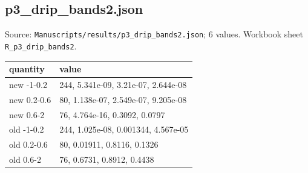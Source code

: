 \subsection*{p3\_drip\_bands2.json}
\noindent\small Source: \nolinkurl{Manuscripts/results/p3_drip_bands2.json}; 6 values. Workbook sheet \texttt{R\_p3\_drip\_bands2}.\par
{\scriptsize\begin{longtable}{p{}p{}}\toprule\textbf{quantity} & \textbf{value}\\\midrule\endhead
{}new -1-0.2 & 244, 5.341e-09, 3.21e-07, 2.644e-08\\
{}new 0.2-0.6 & 80, 1.138e-07, 2.549e-07, 9.205e-08\\
{}new 0.6-2 & 76, 4.764e-16, 0.3092, 0.0797\\
{}old -1-0.2 & 244, 1.025e-08, 0.001344, 4.567e-05\\
{}old 0.2-0.6 & 80, 0.01911, 0.8116, 0.1326\\
{}old 0.6-2 & 76, 0.6731, 0.8912, 0.4438\\
\bottomrule\end{longtable}}


